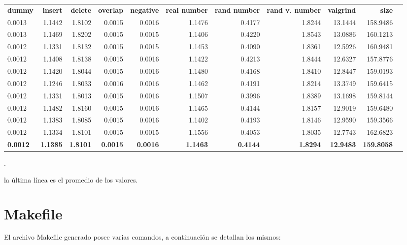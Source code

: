 \documentclass[a4paper, 12pt]{article}
\begin{document}
\begin{adjustwidth}{-2.5 cm}{-2.5 cm}\centering\begin{threeparttable}[!htb]
\caption{PC 2 (en segundos)}\label{tab: }
\scriptsize
\begin{tabular}{lrrrrrrrrrr}\toprule
\textbf{dummy} &\textbf{insert} &\textbf{delete} &\textbf{overlap} &\textbf{negative} &\textbf{real number} &\textbf{rand number} &\textbf{rand v. number} &\textbf{valgrind} &\textbf{size} \\\cmidrule{1-10}
0.0013 &1.1442 &1.8102 &0.0015 &0.0016 &1.1476 &0.4177 &1.8244 &13.1444 &158.9486 \\\cmidrule{1-10}
0.0013 &1.1469 &1.8202 &0.0015 &0.0015 &1.1406 &0.4220 &1.8543 &13.0886 &160.1213 \\\cmidrule{1-10}
0.0012 &1.1331 &1.8132 &0.0015 &0.0015 &1.1453 &0.4090 &1.8361 &12.5926 &160.9481 \\\cmidrule{1-10}
0.0012 &1.1408 &1.8138 &0.0015 &0.0016 &1.1422 &0.4213 &1.8444 &12.6327 &157.8776 \\\cmidrule{1-10}
0.0012 &1.1420 &1.8044 &0.0015 &0.0016 &1.1480 &0.4168 &1.8410 &12.8447 &159.0193 \\\cmidrule{1-10}
0.0012 &1.1246 &1.8033 &0.0016 &0.0016 &1.1462 &0.4191 &1.8214 &13.3749 &159.6415 \\\cmidrule{1-10}
0.0012 &1.1331 &1.8013 &0.0015 &0.0016 &1.1507 &0.3996 &1.8389 &13.1698 &159.8144 \\\cmidrule{1-10}
0.0012 &1.1482 &1.8160 &0.0015 &0.0016 &1.1465 &0.4144 &1.8157 &12.9019 &159.6480 \\\cmidrule{1-10}
0.0012 &1.1383 &1.8085 &0.0015 &0.0016 &1.1402 &0.4193 &1.8146 &12.9590 &159.3566 \\\midrule
0.0012 &1.1334 &1.8101 &0.0015 &0.0015 &1.1556 &0.4053 &1.8035 &12.7743 &162.6823 \\
\textbf{0.0012} &\textbf{1.1385} &\textbf{1.8101} &\textbf{0.0015} &\textbf{0.0016} &\textbf{1.1463} &\textbf{0.4144} &\textbf{1.8294} &\textbf{12.9483} &\textbf{159.8058}  \\
\bottomrule
\end{tabular}
.\end{threeparttable}\end{adjustwidth}
\footnotesize *la última línea es el promedio de los valores.

\newpage
\section{Makefile}
	El archivo Makefile generado posee varias comandos, a continuación se detallan los mismos:
    
\end{document}
